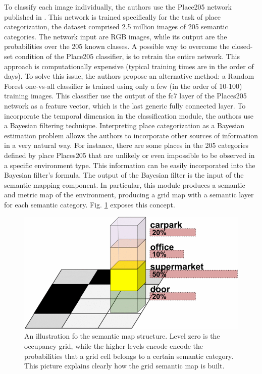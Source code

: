 To classify each image individually, the authors use the Place205 network published in \cite{alma991017170972206031}. This network is trained specifically for the task of place categorization, the dataset comprised 2.5 million images of 205 semantic categories. The network input are RGB images, while its output are the probabilities over the 205 known classes. A possible way to overcome the closed-set condition of the Place205 classifier, is to retrain the entire network. This approach is computationally expensive (typical training times are in the order of days). To solve this issue, the authors propose an alternative method: a Random Forest one-vs-all classifier is trained using only a few (in the order of 10-100) training images. This classifier use the output of the fc7
layer of the Places205 network as a feature vector, which is the last generic fully connected layer. To incorporate the temporal dimension in the classification module, the authors use a Bayesian filtering technique. Interpreting place categorization as a Bayesian estimation problem allows the authors to incorporate other sources of
information in a very natural way. For instance, there are some places in the 205 categories defined by place Places205 that are unlikely or even impossible to be observed in a specific environment type. This information can be easily incorporated into the Bayesian filter's formula. The output of the Bayesian filter is the input of the semantic mapping component. In particular, this module produces a semantic and metric map of the environment, producing a grid map with a semantic layer for each semantic category. Fig. \ref{fig:grid_semantic_map} exposes this concept.

\begin{figure}[h!]
	\centering
	\includegraphics[width=0.7\linewidth]{images/gird_map_semantic.png}
	\caption{An illustration fo the semantic map structure. Level zero is the occupancy grid, while the higher levels encode encode the probabilities that a grid cell belongs to a
		certain semantic category. This picture explains clearly how the grid semantic map is built.}
	\label{fig:grid_semantic_map}
\end{figure}

